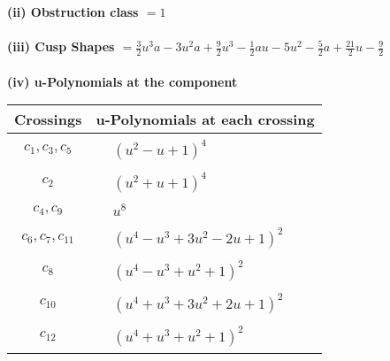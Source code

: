 \documentclass[1p]{elsarticle_modified}
\theoremstyle{definition}
\begin{document}
\flushleft \textbf{(ii) Obstruction class $= 1$}\\~\\
\flushleft \textbf{(iii) Cusp Shapes $= \frac{3}{2} u^3 a-3 u^2 a+\frac{9}{2} u^3-\frac{1}{2} a u-5 u^2-\frac{5}{2} a+\frac{21}{2} u-\frac{9}{2}$}\\~\\
\newpage\renewcommand{\arraystretch}{1}
\flushleft \textbf{(iv) u-Polynomials at the component}\newline \\
\begin{tabular}{m{50pt}|m{274pt}}
Crossings & \hspace{64pt}u-Polynomials at each crossing \\
\hline $$\begin{aligned}c_{1},c_{3},c_{5}\end{aligned}$$&$\begin{aligned}
&(u^2- u+1)^4
\end{aligned}$\\
\hline $$\begin{aligned}c_{2}\end{aligned}$$&$\begin{aligned}
&(u^2+u+1)^4
\end{aligned}$\\
\hline $$\begin{aligned}c_{4},c_{9}\end{aligned}$$&$\begin{aligned}
&u^8
\end{aligned}$\\
\hline $$\begin{aligned}c_{6},c_{7},c_{11}\end{aligned}$$&$\begin{aligned}
&(u^4- u^3+3 u^2-2 u+1)^2
\end{aligned}$\\
\hline $$\begin{aligned}c_{8}\end{aligned}$$&$\begin{aligned}
&(u^4- u^3+u^2+1)^2
\end{aligned}$\\
\hline $$\begin{aligned}c_{10}\end{aligned}$$&$\begin{aligned}
&(u^4+u^3+3 u^2+2 u+1)^2
\end{aligned}$\\
\hline $$\begin{aligned}c_{12}\end{aligned}$$&$\begin{aligned}
&(u^4+u^3+u^2+1)^2
\end{aligned}$\\
\hline
\end{tabular}\\~\\
\end{document}
